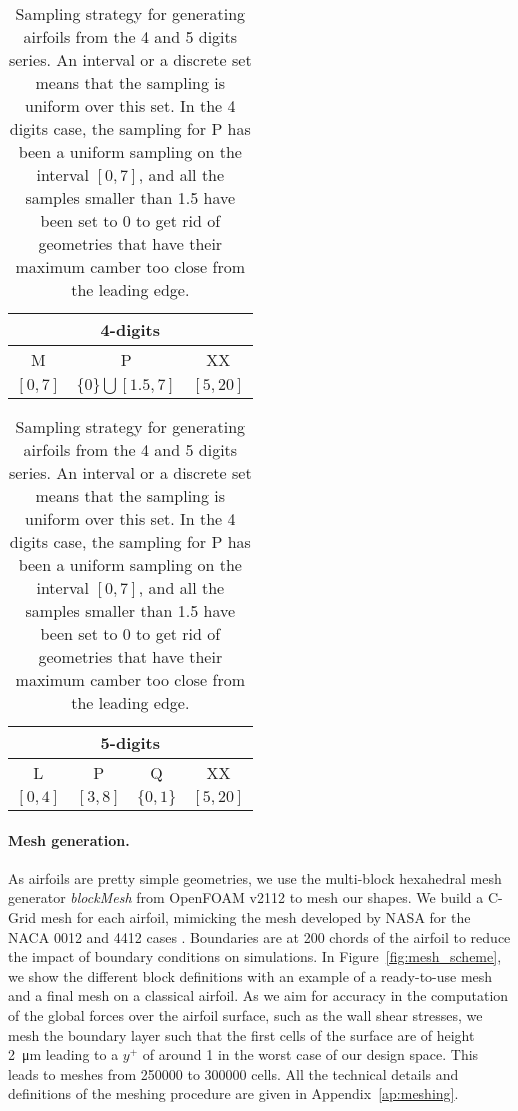 \begin{table}
	\caption[Sampling strategy for generating airfoils from the 4 and 5 digits series.]{Sampling strategy for generating airfoils from the 4 and 5 digits series. An interval or a discrete set means that the sampling is uniform over this set. In the 4 digits case, the sampling for P has been a uniform sampling on the interval $[0, 7]$, and all the samples smaller than 1.5 have been set to 0 to get rid of geometries that have their maximum camber too close from the leading edge.}
	\label{tab:sample-NACA}
	\centering
	\begin{tabular}{ccc}
		\toprule
		\multicolumn{3}{c}{4-digits}                  \\
		\midrule
		M & P & XX \\
		\midrule
		$[0, 7]$ & $\{0\}\bigcup [1.5, 7]$ & $[5, 20]$      \\
		\bottomrule
	\end{tabular} \hspace{1cm}
	\begin{tabular}{cccc}
		\toprule
		\multicolumn{4}{c}{5-digits}                    \\
		\midrule
		L & P & Q & XX \\
		\midrule
		$[0, 4]$ & $[3, 8]$ & $\{0, 1\}$ & $[5, 20]$      \\
		\bottomrule
	\end{tabular}
\end{table}

\paragraph{Mesh generation.} As airfoils are pretty simple geometries, we use the multi-block hexahedral mesh generator \emph{blockMesh} from OpenFOAM v2112 \cite{OpenFOAM} to mesh our shapes. We build a C-Grid mesh for each airfoil, mimicking the mesh developed by \acrshort{NASA} for the \acrshort{NACA} 0012 and 4412 cases \cite{TMR}. Boundaries are at 200 chords of the airfoil to reduce the impact of boundary conditions on simulations. In Figure~\ref{fig:mesh_scheme}, we show the different block definitions with an example of a ready-to-use mesh and a final mesh on a classical airfoil. As we aim for accuracy in the computation of the global forces over the airfoil surface, such as the wall shear stresses, we mesh the boundary layer such that the first cells of the surface are of height \SI{2}{\micro\meter} leading to a $y^{+}$ of around 1 in the worst case of our design space. This leads to meshes from \SI{250000}{} to \SI{300000}{} cells. All the technical details and definitions of the meshing procedure are given in Appendix~\ref{ap:meshing}.


